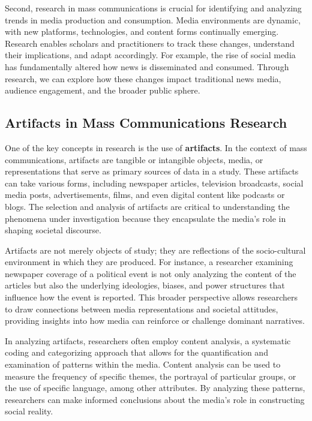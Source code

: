 \documentclass[
]{book}
\begin{document}
Second, research in mass communications is crucial for identifying and analyzing trends in media production and consumption. Media environments are dynamic, with new platforms, technologies, and content forms continually emerging. Research enables scholars and practitioners to track these changes, understand their implications, and adapt accordingly. For example, the rise of social media has fundamentally altered how news is disseminated and consumed. Through research, we can explore how these changes impact traditional news media, audience engagement, and the broader public sphere.

\subsection*{Artifacts in Mass Communications Research}\label{artifacts-in-mass-communications-research}

One of the key concepts in research is the use of \textbf{artifacts}. In the context of mass communications, artifacts are tangible or intangible objects, media, or representations that serve as primary sources of data in a study. These artifacts can take various forms, including newspaper articles, television broadcasts, social media posts, advertisements, films, and even digital content like podcasts or blogs. The selection and analysis of artifacts are critical to understanding the phenomena under investigation because they encapsulate the media's role in shaping societal discourse.

Artifacts are not merely objects of study; they are reflections of the socio-cultural environment in which they are produced. For instance, a researcher examining newspaper coverage of a political event is not only analyzing the content of the articles but also the underlying ideologies, biases, and power structures that influence how the event is reported. This broader perspective allows researchers to draw connections between media representations and societal attitudes, providing insights into how media can reinforce or challenge dominant narratives.

In analyzing artifacts, researchers often employ content analysis, a systematic coding and categorizing approach that allows for the quantification and examination of patterns within the media. Content analysis can be used to measure the frequency of specific themes, the portrayal of particular groups, or the use of specific language, among other attributes. By analyzing these patterns, researchers can make informed conclusions about the media's role in constructing social reality.
\end{document}
